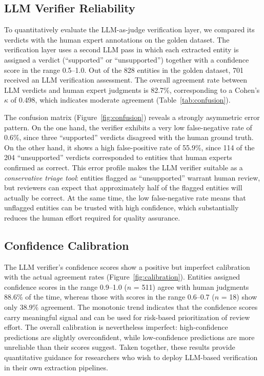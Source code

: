 \documentclass[12pt,a4paper]{article}
\begin{document}
\subsection{LLM Verifier Reliability}
\label{sec:verifier}

To quantitatively evaluate the LLM-as-judge verification layer, we compared its verdicts with the human expert annotations on the golden dataset. The verification layer uses a second LLM pass in which each extracted entity is assigned a verdict (``supported'' or ``unsupported'') together with a confidence score in the range 0.5--1.0. Out of the 828 entities in the golden dataset, 701 received an LLM verification assessment. The overall agreement rate between LLM verdicts and human expert judgments is 82.7\%, corresponding to a Cohen's $\kappa$ of 0.498, which indicates moderate agreement (Table~\ref{tab:confusion}).

The confusion matrix (Figure~\ref{fig:confusion}) reveals a strongly asymmetric error pattern. On the one hand, the verifier exhibits a very low false-negative rate of 0.6\%, since three ``supported'' verdicts disagreed with the human ground truth. On the other hand, it shows a high false-positive rate of 55.9\%, since 114 of the 204 ``unsupported'' verdicts corresponded to entities that human experts confirmed as correct. This error profile makes the LLM verifier suitable as a \textit{conservative triage tool}: entities flagged as ``unsupported'' warrant human review, but reviewers can expect that approximately half of the flagged entities will actually be correct. At the same time, the low false-negative rate means that unflagged entities can be trusted with high confidence, which substantially reduces the human effort required for quality assurance.

\subsection{Confidence Calibration}
\label{sec:calibration}

The LLM verifier's confidence scores show a positive but imperfect calibration with the actual agreement rates (Figure~\ref{fig:calibration}). Entities assigned confidence scores in the range 0.9--1.0 ($n$ = 511) agree with human judgments 88.6\% of the time, whereas those with scores in the range 0.6--0.7 ($n$ = 18) show only 38.9\% agreement. The monotonic trend indicates that the confidence scores carry meaningful signal and can be used for risk-based prioritization of review effort. The overall calibration is nevertheless imperfect: high-confidence predictions are slightly overconfident, while low-confidence predictions are more unreliable than their scores suggest. Taken together, these results provide quantitative guidance for researchers who wish to deploy LLM-based verification in their own extraction pipelines.
\end{document}
